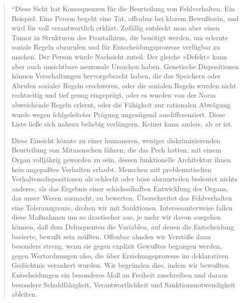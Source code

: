\documentclass[
  a4paper,
]{report}
\begin{document}
\begin{quote}
``Diese Sicht hat Konsequenzen für die Beurteilung von Fehlverhalten. Ein Beispiel: Eine Person begeht eine Tat, offenbar bei klarem Bewußtsein, und wird für voll verantwortlich erklärt. Zufällig entdeckt man aber einen Tumor in Strukturen des Frontalhirns, die benötigt werden, um erlernte soziale Regeln abzurufen und für Entscheidungsprozesse verfügbar zu machen. Der Person würde Nachsicht zuteil. Der gleiche »Defekt« kann aber auch unsichtbare neuronale Ursachen haben. Genetische Dispositionen können Verschaltungen hervorgebracht haben, die das Speichern oder Abrufen sozialer Regeln erschweren, oder die sozialen Regeln wurden nicht rechtzeitig und tief genug eingeprägt, oder es wurden von der Norm abweichende Regeln erlernt, oder die Fähigkeit zur rationalen Abwägung wurde wegen fehlgeleiteter Prägung ungenügend ausdifferenziert. Diese Liste ließe sich nahezu beliebig verlängern. Keiner kann anders, als er ist.

Diese Einsicht könnte zu einer humaneren, weniger diskriminierenden Beurteilung von Mitmenschen führen, die das Pech hatten, mit einem Organ volljährig geworden zu sein, dessen funktionelle Architektur ihnen kein angepaßtes Verhalten erlaubt. Menschen mit problematischen Verhaltensdispositionen als schlecht oder böse abzuurteilen bedeutet nichts anderes, als das Ergebnis einer schicksalhaften Entwicklung des Organs, das unser Wesen ausmacht, zu bewerten. Überschreitet das Fehlverhalten eine Toleranzgrenze, drohen wir mit Sanktionen. Interessanterweise fallen diese Maßnahmen um so drastischer aus, je mehr wir davon ausgehen können, daß dem Delinquenten die Variablen, auf denen die Entscheidung basierte, bewußt sein müßten. Offenbar ahnden wir Verstöße dann besonders streng, wenn sie gegen explizit Gewußtes begangen werden, gegen Wertordnungen also, die über Erziehungsprozesse im deklarativen Gedächtnis verankert wurden. Wir begründen dies, indem wir bewußten Entscheidungen ein besonderes Maß an Freiheit zuschreiben und daraus besondere Schuldfähigkeit, Verantwortlichkeit und Sanktionsnotwendigkeit ableiten.


\end{quote}
\end{document}
